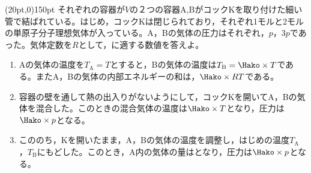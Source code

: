 \hakosyokika
\item
    \begin{mawarikomi}(20pt,0){150pt}{}
        それぞれの容器が$V$の２つの容器A,BがコックKを取り付けた細い管で結ばれている。はじめ，コックKは閉じられており，それぞれ1モルと2モルの単原子分子理想気体が入っている。A，Bの気体の圧力はそれぞれ，$p$，$3p$であった。気体定数を$R$として，\karaHako に適する数値を答えよ。
        \begin{enumerate}
            \item Aの気体の温度を$T_\mathrm{A}=T$とすると，Bの気体の温度は$T_\mathrm{B}=\Hako \times T$である。またA，Bの気体の内部エネルギーの和は，$\Hako \times RT$である。
            \item 容器の壁を通して熱の出入りがないようにして，コックKを開いてA，Bの気体を混合した。このときの混合気体の温度は$\Hako \times T$となり，圧力は$\Hako \times p$となる。
            \item こののち，Kを開いたまま，A，Bの気体の温度を調整し，はじめの温度$T_\mathrm{A}$，$T_\mathrm{B}$にもどした。このとき，A内の気体の量は\Hako {}となり，圧力は$\Hako \times p$となる。
        \end{enumerate}
    \end{mawarikomi}